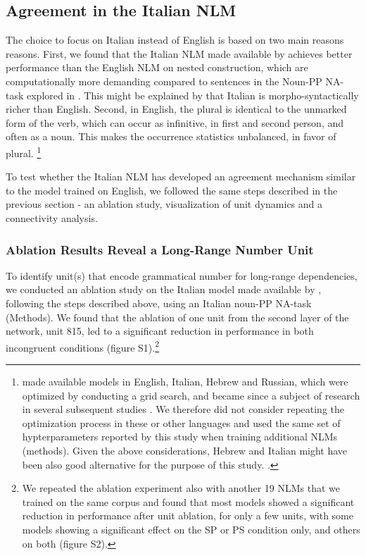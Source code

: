 \subsection{Agreement in the Italian NLM}
The choice to focus on Italian instead of English is based on two main reasons reasons. First, we found that the Italian NLM made available by \citet{Gulordava:etal:2018} achieves better performance than the English NLM on nested construction, which are computationally more demanding compared to sentences in the Noun-PP NA-task explored in \citet{lakretz2019emergence}. This might be explained by that Italian is morpho-syntactically richer than English. Second, in English, the plural is identical to the unmarked form of the verb, which can occur as infinitive, in first and second person, and often as a noun. This makes the occurrence statistics unbalanced, in favor of plural. \footnote{\citet{Gulordava:etal:2018} made available models in English, Italian, Hebrew and Russian, which were optimized by conducting a grid search, and became since a subject of research in several subsequent studies \citep{Giulianelli:etal:2018, jumelet2019analysing, wilcox2018rnn, futrell2019neural}. We therefore did not consider repeating the optimization process in these or other languages and used the same set of hypterparameters reported by this study when training additional NLMs (methods). Given the above considerations, Hebrew and Italian might have been also good alternative for the purpose of this study. .}

To test whether the Italian NLM has developed an agreement mechanism similar to the model trained on English, we followed the same steps described in the previous section - an ablation study, visualization of unit dynamics and a connectivity analysis.

\subsubsection{Ablation Results Reveal a Long-Range Number Unit} To identify unit(s) that encode grammatical number for long-range dependencies, we conducted an ablation study on the Italian model made available by \citet{Gulordava:etal:2018}, following the steps described above, using an Italian noun-PP NA-task (Methods). We found that the ablation of one unit from the second layer of the network, unit 815, led to a significant reduction in performance in both incongruent conditions (figure S1).\footnote{We repeated the ablation experiment also with another 19 NLMs that we trained on the same corpus and found that most models showed a significant reduction in performance after unit ablation, for only a few units, with some models showing a significant effect on the SP or PS condition only, and others on both (figure S2).}

